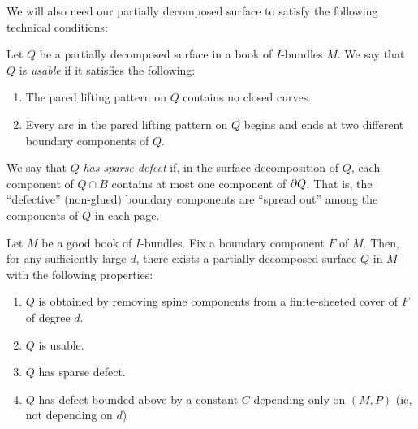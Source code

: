 We will also need our partially decomposed surface to satisfy the following
technical conditions:

\begin{defn}

Let $Q$ be a partially decomposed surface in a book of $I$-bundles $M$. We say
that $Q$ is \emph{usable} if it satisfies the following:

\begin{enumerate}

\item The pared lifting pattern on $Q$ contains no closed curves.

\item Every arc in the pared lifting pattern on $Q$ begins and ends at two
different boundary components of $Q$.

\end{enumerate}

\end{defn}

\begin{defn}

We say that $Q$ \emph{has sparse defect} if, in the surface decomposition of
$Q$, each component of $Q \cap B$ contains at most one component of $\partial Q$.
That is, the ``defective'' (non-glued) boundary components are ``spread out''
among the components of $Q$ in each page.

\end{defn}

\begin{lemma}\label{L:jigsaw}

Let $M$ be a good book of $I$-bundles. Fix a boundary component $F$ of $M$.
Then, for any sufficiently large $d$, there exists a partially decomposed
surface $Q$ in $M$ with the following properties:

\begin{enumerate}

\item $Q$ is obtained by removing spine components from a finite-sheeted cover
of $F$ of degree $d$.

\item $Q$ is usable.

\item $Q$ has sparse defect.

\item $Q$ has defect bounded above by a constant $C$ depending only on $(M,P)$
(ie, not depending on $d$)

\end{enumerate}

\end{lemma}

